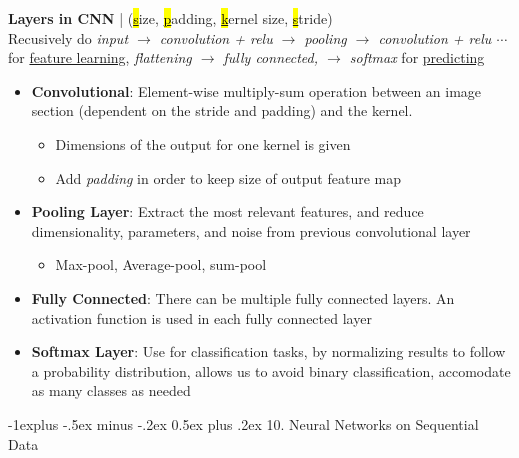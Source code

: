 \documentclass[10pt,landscape]{article}
\makeatletter
\renewcommand{\subsection}{\@startsection{subsection}{2}{0mm}%
                                {-1explus -.5ex minus -.2ex}%
                                {0.5ex plus .2ex}%
                                {\normalfont\normalsize\bfseries}}
\makeatother
\begin{document}
\begin{multicols*}{3}
\textbf{Layers in CNN} | (\underline{\hl{s}}ize, \underline{\hl{p}}adding, \underline{\hl{k}}ernel size, \underline{\hl{s}}tride) \\ 
Recusively do \textit{input $\rightarrow$ convolution + relu $\rightarrow$ pooling $\rightarrow$ convolution + relu $\cdots$} for \underline{feature learning}, \textit{flattening $\rightarrow$ fully connected, $\rightarrow$ softmax} for \underline{predicting}
\begin{itemize}[topsep=0pt,noitemsep,wide=0pt, leftmargin=\dimexpr{} + 2\relax]
  \item \textbf{Convolutional}: Element-wise multiply-sum operation between an image section (dependent on the stride and padding) and the kernel. 
  \begin{itemize}[topsep=0pt,noitemsep,wide=0pt, leftmargin=\dimexpr{} + 2\relax]
    \item Dimensions of the output for one kernel is given \noindent{}
    \item Add \textit{padding} in order to keep size of output feature map
  \end{itemize}
  \item \textbf{Pooling Layer}: Extract the most relevant features, and reduce dimensionality, parameters, and noise from previous convolutional layer
  \begin{itemize}[topsep=0pt,noitemsep,wide=0pt, leftmargin=\dimexpr{} + 2\relax]
    \item Max-pool, Average-pool, sum-pool
  \end{itemize}
  \item \textbf{Fully Connected}: There can be multiple fully connected layers. An activation function is used in each fully connected layer
  \item \textbf{Softmax Layer}: Use for classification tasks, by normalizing results to follow a probability distribution, allows us to avoid binary classification, accomodate as many classes as needed
\end{itemize}

\subsection{10. Neural Networks on Sequential Data}

\end{multicols*}
\end{document}
